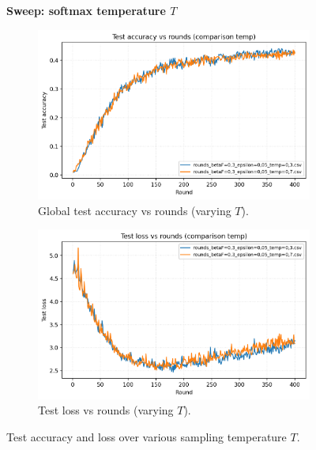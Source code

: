 \documentclass[10pt,twocolumn,letterpaper]{article}
\begin{document}
\label{sec:plots-temp}
\begin{figure}[htbp]
\noindent\textbf{Sweep: softmax temperature \(T\)}

  \centering
  \begin{subfigure}[b]{0.48\linewidth}
    \centering
    \includegraphics[width=\linewidth]{figs/compare_test_acc_temp.png}
    \caption{Global test accuracy vs rounds (varying \(T\)).}
    \label{fig:temp-acc}
  \end{subfigure}
  \hfill
  \begin{subfigure}[b]{0.48\linewidth}
    \centering
    \includegraphics[width=\linewidth]{figs/compare_test_loss_temp.png}
    \caption{Test loss vs rounds (varying \(T\)).}
    \label{fig:temp-loss}
  \end{subfigure}
  \caption{Test accuracy and loss over various sampling temperature \(T\).}
  \label{fig:temp-sweep}
\end{figure}
\FloatBarrier
\end{document}
